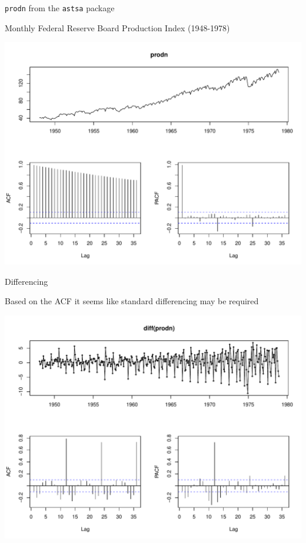 \documentclass[11pt,ignorenonframetext,]{beamer}
\begin{document}
\begin{frame}{\texttt{prodn} from the \texttt{astsa} package}

Monthly Federal Reserve Board Production Index (1948-1978)

\includegraphics{Lec11_files/figure-beamer/unnamed-chunk-12-1.pdf}

\end{frame}

\begin{frame}{Differencing}

Based on the ACF it seems like standard differencing may be required

\includegraphics{Lec11_files/figure-beamer/unnamed-chunk-13-1.pdf}

\end{frame}
\end{document}
